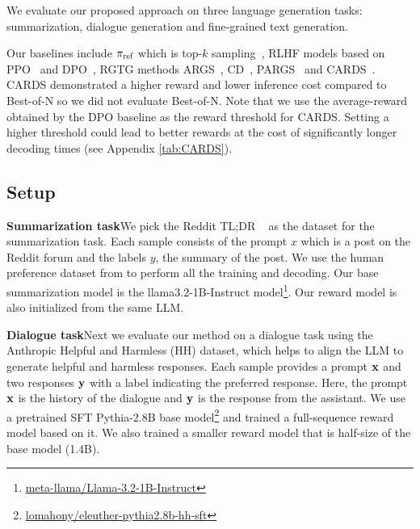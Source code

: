 

We evaluate our proposed approach on three language generation tasks: summarization, dialogue generation and fine-grained text generation. 

Our baselines include $\pi_\text{ref}$ which is top-\(k\) sampling~\cite{fan2018hierarchical}, RLHF models based on PPO~\cite{schulman2017proximal} and DPO~\cite{rafailov2023direct}, RGTG methods ARGS~\cite{khanov2023alignment}, CD~\cite{mudgalcontrolled}, PARGS~\cite{rashid2024critical} and CARDS~\cite{li2024cascade}. CARDS demonstrated a higher reward and lower inference cost compared to Best-of-N so we did not evaluate Best-of-N. Note that we use the average-reward obtained by the DPO baseline as the reward threshold for CARDS. Setting a higher threshold could lead to better rewards at the cost of significantly longer decoding times (see Appendix \ref{tab:CARDS}). 

\subsection{Setup}
\label{subsec:setup}
\textbf{Summarization task}\quad We pick the Reddit TL;DR ~\cite{volske2017tl} as the dataset for the summarization task. Each sample consists of the prompt $x$ which is a post on the Reddit forum and the labels $y$, the summary of the post.
We use the human preference dataset from \citet{stiennon2020learning} to perform all the training and decoding.
Our base summarization model is the llama3.2-1B-Instruct model\footnote{\href{https://huggingface.co/meta-llama/Llama-3.2-1B-Instruct}{meta-llama/Llama-3.2-1B-Instruct}}. Our reward model is also initialized from the same LLM.

\textbf{Dialogue task}\quad Next we evaluate our method on a dialogue task using the Anthropic Helpful and Harmless (HH) \cite{bai2022training} dataset, which helps to align the LLM to generate helpful and harmless responses. Each sample provides a prompt ${\mathbf{x}}$ and two responses ${\mathbf{y}}$ with a label indicating the preferred response. Here, the prompt ${\mathbf{x}}$ is the history of the dialogue and ${\mathbf{y}}$ is the response from the assistant.
We use a pretrained SFT Pythia-2.8B base model\footnote{\href{https://huggingface.co/lomahony/eleuther-pythia2.8b-hh-sft}{lomahony/eleuther-pythia2.8b-hh-sft}} and trained a full-sequence reward model based on it. We also trained a smaller reward model that is half-size of the base model (1.4B).

